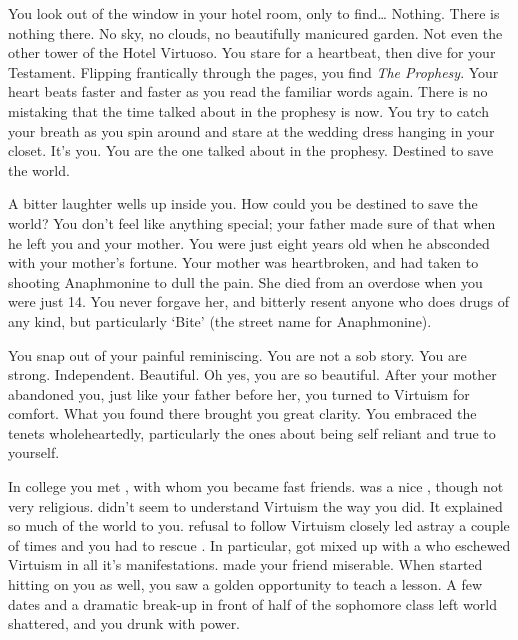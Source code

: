 \documentclass[char]{guildcamp1}
\begin{document}
\name{\cBride{}}

You look out of the window in your hotel room, only to find{\ldots} Nothing. There is nothing there. No sky, no clouds, no beautifully manicured garden. Not even the other tower of the Hotel Virtuoso. You stare for a heartbeat, then dive for your Testament. Flipping frantically through the pages, you find {\em The Prophesy}. Your heart beats faster and faster as you read the familiar words again. There is no mistaking that the time talked about in the prophesy is now. You try to catch your breath as you spin around and stare at the wedding dress hanging in your closet. It's you. You are the one talked about in the prophesy. Destined to save the world.

A bitter laughter wells up inside you. How could you be destined to save the world? You don't feel like anything special; your father made sure of that when he left you and your mother. You were just eight years old when he absconded with your mother's fortune. Your mother was heartbroken, and had taken to shooting Anaphmonine to dull the pain. She died from an overdose when you were just 14. You never forgave her, and bitterly resent anyone who does drugs of any kind, but particularly `Bite' (the street name for Anaphmonine).

You snap out of your painful reminiscing. You are not a sob story. You are strong. Independent. Beautiful. Oh yes, you are so beautiful. After your mother abandoned you, just like your father before her, you turned to Virtuism for comfort. What you found there brought you great clarity. You embraced the tenets wholeheartedly, particularly the ones about being self reliant and true to yourself.

In college you met \cRival{}, with whom you became fast friends. \cRival{\They} was a nice \cRival{\kid}, though not very religious. \cRival{\They} didn't seem to understand Virtuism the way you did. It explained so much of the world to you. \cRival{\Them} refusal to follow Virtuism closely led \cRival{} astray a couple of times and you had to rescue \cRival{\them}. In particular, \cRival{\they} got \cRival{\themself} mixed up with a \cRivalEx{\kid} who eschewed Virtuism in all it's manifestations. \cRivalEx{\They} made your friend miserable. When \cRivalEx{\they} started hitting on you as well, you saw a golden opportunity to teach \cRivalEx{\them} a lesson. A few dates and a dramatic break-up in front of half of the sophomore class left \cRivalEx{\their} world shattered, and you drunk with power.
\end{document}
